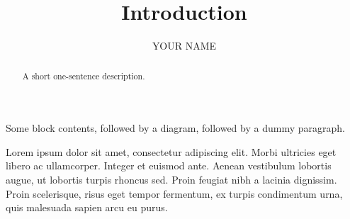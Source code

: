 \documentclass{ximera}
\author{YOUR NAME}
\title{Introduction}
\begin{document}
\begin{abstract}
    A short one-sentence description.
\end{abstract}
\maketitle


Some block contents, followed by a diagram, followed by a dummy paragraph.

    \begin{image}
    \end{image}

    Lorem ipsum dolor sit amet, consectetur adipiscing elit. Morbi ultricies
    eget libero ac ullamcorper. Integer et euismod ante. Aenean vestibulum
    lobortis augue, ut lobortis turpis rhoncus sed. Proin feugiat nibh a
    lacinia dignissim. Proin scelerisque, risus eget tempor fermentum, ex
    turpis condimentum urna, quis malesuada sapien arcu eu purus.
\end{document}
